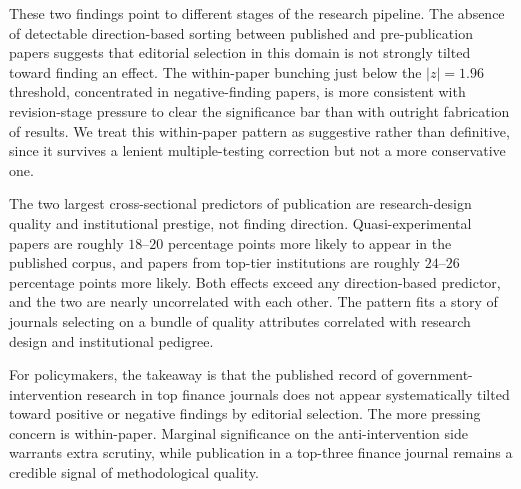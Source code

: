 \documentclass[12pt]{article}
\begin{document}
These two findings point to different stages of the research
pipeline.  The absence of detectable direction-based sorting
between published and pre-publication papers suggests that
editorial selection in this domain is not strongly tilted toward
finding an effect.  The within-paper bunching just below the
$|z|=1.96$ threshold, concentrated in negative-finding papers, is
more consistent with revision-stage pressure to clear the
significance bar than with outright fabrication of results.  We
treat this within-paper pattern as suggestive rather than
definitive, since it survives a lenient multiple-testing
correction but not a more conservative one.

The two largest cross-sectional predictors of publication are
research-design quality and institutional prestige, not finding
direction.  Quasi-experimental papers are roughly $18$--$20$
percentage points more likely to appear in the published corpus,
and papers from top-tier institutions are roughly $24$--$26$
percentage points more likely.  Both effects exceed any
direction-based predictor, and the two are nearly uncorrelated
with each other.  The pattern fits a story of journals selecting
on a bundle of quality attributes correlated with research design
and institutional pedigree.

For policymakers, the takeaway is that the published record of
government-intervention research in top finance journals does not
appear systematically tilted toward positive or negative findings
by editorial selection.  The more pressing concern is within-paper.
Marginal significance on the anti-intervention side warrants extra
scrutiny, while publication in a top-three finance journal remains
a credible signal of methodological quality.

\newpage




\end{document}
